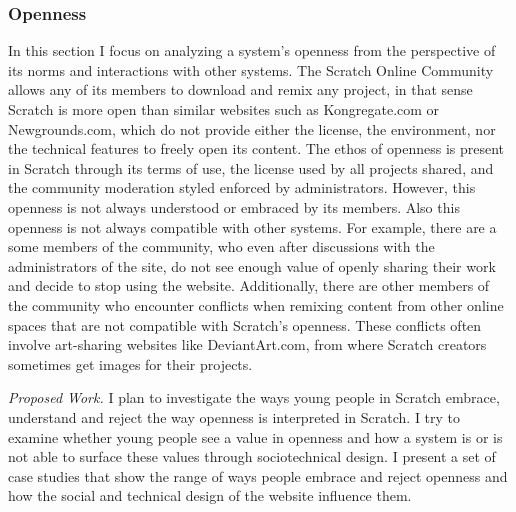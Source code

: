 
\subsubsection{Openness}
In this section I focus on analyzing a system's openness from the perspective of its norms and interactions with other systems.
The Scratch Online Community allows any of its members to download and remix any project, in that sense Scratch is more open than similar websites such as Kongregate.com or Newgrounds.com, which do not provide either the license, the environment, nor the technical features to freely open its content. 
The ethos of openness is present in Scratch through its terms of use, the license used by all projects shared, and the community moderation styled enforced by administrators.
However, this openness is not always understood or embraced by its members.
Also this openness is not always compatible with other systems.
For example, there are a some members of the community, who even after discussions with the administrators of the site, do not see enough value of openly sharing their work and decide to stop using the website. 
Additionally, there are other members of the community who encounter conflicts when remixing content from other online spaces that are not compatible with Scratch's openness. 
These conflicts often involve art-sharing websites like DeviantArt.com, from where Scratch creators sometimes get images for their projects.

\emph{Proposed Work.}
I plan to investigate the ways young people in Scratch embrace, understand and reject the way openness is interpreted in Scratch.
I try to examine whether young people see a value in openness and how a system is or is not able to surface these values through sociotechnical design.
I present a set of case studies that show the range of ways people embrace and reject openness and how the social and technical design of the website influence them. 


